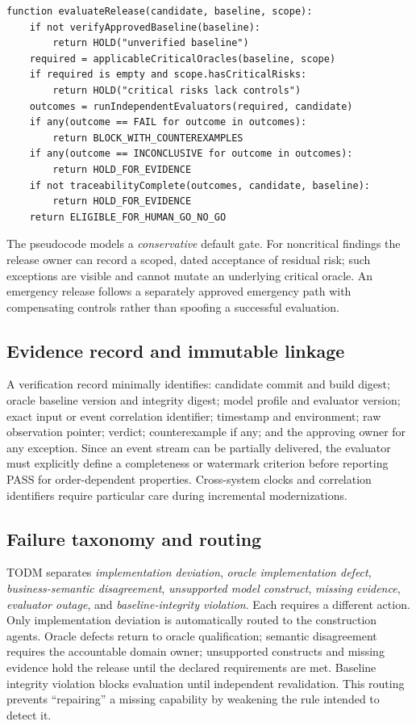 \documentclass[11pt,a4paper]{article}
\newcommand{\PASS}{\textsf{PASS}}
\begin{document}
\begin{lstlisting}[caption={Normative gate policy, expressed as pseudocode.},label={lst:gate}]
function evaluateRelease(candidate, baseline, scope):
    if not verifyApprovedBaseline(baseline):
        return HOLD("unverified baseline")
    required = applicableCriticalOracles(baseline, scope)
    if required is empty and scope.hasCriticalRisks:
        return HOLD("critical risks lack controls")
    outcomes = runIndependentEvaluators(required, candidate)
    if any(outcome == FAIL for outcome in outcomes):
        return BLOCK_WITH_COUNTEREXAMPLES
    if any(outcome == INCONCLUSIVE for outcome in outcomes):
        return HOLD_FOR_EVIDENCE
    if not traceabilityComplete(outcomes, candidate, baseline):
        return HOLD_FOR_EVIDENCE
    return ELIGIBLE_FOR_HUMAN_GO_NO_GO
\end{lstlisting}

The pseudocode models a \emph{conservative} default gate. For noncritical findings the release owner can record a scoped, dated acceptance of residual risk; such exceptions are visible and cannot mutate an underlying critical oracle. An emergency release follows a separately approved emergency path with compensating controls rather than spoofing a successful evaluation.

\subsection{Evidence record and immutable linkage}
A verification record minimally identifies: candidate commit and build digest; oracle baseline version and integrity digest; model profile and evaluator version; exact input or event correlation identifier; timestamp and environment; raw observation pointer; verdict; counterexample if any; and the approving owner for any exception. Since an event stream can be partially delivered, the evaluator must explicitly define a completeness or watermark criterion before reporting \PASS{} for order-dependent properties. Cross-system clocks and correlation identifiers require particular care during incremental modernizations.

\subsection{Failure taxonomy and routing}
TODM separates \emph{implementation deviation}, \emph{oracle implementation defect}, \emph{business-semantic disagreement}, \emph{unsupported model construct}, \emph{missing evidence}, \emph{evaluator outage}, and \emph{baseline-integrity violation}. Each requires a different action. Only implementation deviation is automatically routed to the construction agents. Oracle defects return to oracle qualification; semantic disagreement requires the accountable domain owner; unsupported constructs and missing evidence hold the release until the declared requirements are met. Baseline integrity violation blocks evaluation until independent revalidation. This routing prevents ``repairing'' a missing capability by weakening the rule intended to detect it.
\end{document}
